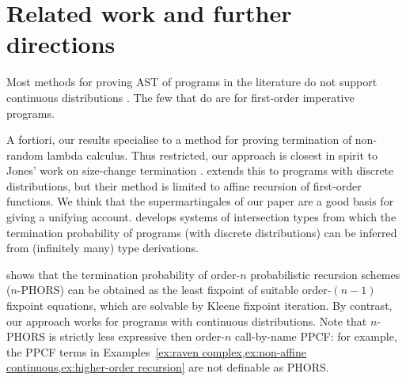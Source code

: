 \section{Related work and further directions}
\label{sec:related}

 

Most methods for proving AST of programs in the literature do not support continuous distributions \citep{DBLP:journals/toplas/LagoG19,DBLP:journals/jacm/KaminskiKMO18,DBLP:conf/lics/OlmedoKKM16,DBLP:conf/lics/KobayashiLG19,DBLP:conf/mfcs/KaminskiK15,DBLP:series/mcs/McIverM05}.
The few that do \citep{DBLP:conf/popl/FioritiH15,DBLP:conf/pldi/ChenH20,DBLP:journals/toplas/ChatterjeeFNH18} are for first-order imperative programs.

A fortiori, our results specialise to a method for proving termination of non-random lambda calculus. 
Thus restricted, our approach is closest in spirit to Jones' work on size-change termination \citep{DBLP:journals/lmcs/JonesB08,DBLP:conf/aplas/SereniJ05}. 
\cite{DBLP:journals/toplas/LagoG19} extends this to programs with discrete distributions, but their method is limited to affine recursion of first-order functions.
We think that the supermartingales of our paper are a good basis for giving a unifying account.
\cite{DBLP:conf/ppdp/BreuvartL18} develops systems of intersection types from which the termination probability of programs (with discrete distributions) can be inferred from (infinitely many) type derivations.  

\cite{DBLP:conf/lics/KobayashiLG19} shows that the termination probability of order-$n$ probabilistic recursion schemes ($n$-PHORS) can be obtained as the least fixpoint of suitable order-$(n-1)$ fixpoint equations, which are solvable by Kleene fixpoint iteration.  
By contrast, our approach works for programs with continuous distributions. 
Note that $n$-PHORS is strictly less expressive then order-$n$ call-by-name PPCF:
for example, the PPCF terms in Examples~\ref{ex:raven complex,ex:non-affine continuous,ex:higher-order recursion}
are not definable as PHORS.

